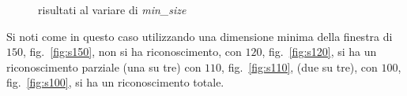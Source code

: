 \documentclass[a4paper,11pt]{article}
\begin{document}
\begin{figure}[htbp]
  \caption{risultati al variare di \emph{min\_size}}
  \label{fig:minsize}
\end{figure}

Si noti come in questo caso utilizzando una dimensione minima della
finestra di $150$, fig.~\ref{fig:s150}, non si ha riconoscimento, con
$120$, fig.~\ref{fig:s120}, si ha un riconoscimento parziale (una su
tre) con $110$, fig.~\ref{fig:s110}, (due su tre), con $100$,
fig.~\ref{fig:s100}, si ha un riconoscimento totale.\\
\end{document}
